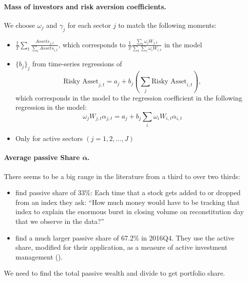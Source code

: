 \paragraph{Mass of investors and risk aversion coefficients.}
We choose $\omega_j$ and $\gamma_j$ for each sector $j$ to match the following moments:
\begin{itemize}
    \item 	$\frac{1}{T} \sum_t\frac{Assets_{j,t}}{\sum_i Assets_{i,t}}$, which corresponds to $\frac{1}{T}\frac{\sum_t\omega_jW_{j,t}}{\sum_t\sum_i\omega_iW_{i,t}}$ in the model
    \item $\{b_j\}_j$ from time-series regressions of
    \[\text{Risky Asset}_{j,t}=a_j+b_j\left(\sum_j\text{Risky Asset}_{i,t} \right), \]
    which corresponds in the model to the regression coefficient in the following regression in the model:
    \[\omega_jW_{j,t}\alpha_{j,t}=a_j+b_j\sum_i\omega_iW_{i,t}\alpha_{i,t}\]
    \item Only for active sectors $(j=1,2,\ldots,J)$
\end{itemize}

\paragraph{Average passive Share $\boldsymbol{\overline{\alpha}}$.}
There seems to be a big range in the literature from a third to over two thirds:
\begin{itemize}
    \item \cite{chinco2024passive} find passive share of 33\%: Each time that a stock gets added to or dropped from an index they ask: ``How much money would have to be tracking that index to explain the enormous burst in closing volume on reconstitution day that we observe in the data?'' 
    \item \cite{koijen2024investors} find a much larger passive share of 67.2\% in 2016Q4. They use the active share, modified for their application, as a measure of active investment management (\citealp{cremers2009active}).
\end{itemize}
We need to find the total passive wealth and divide to get portfolio share.

